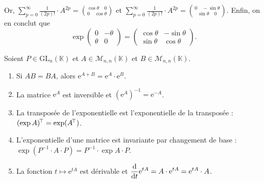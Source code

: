 \begin{exm}
\begin{enumerate}
			\null\hfill\null
			 \null\hfill\null

			Or, $\sum_{p=0}^{\infty} \frac{1}{(2p)!} \cdot A^{2p} = {\cos \theta\quad 0\choose 0 \quad \cos \theta}$\/ et $\sum_{p=0}^{\infty} \frac{1}{(2p)!} \cdot A^{2p} = {0 \quad -\sin \theta\choose \sin \theta \quad 0}$.
			Enfin, on en conclut que \[
				\exp \begin{pmatrix}
					0 & -\theta\\
					\theta & 0
				\end{pmatrix} = \begin{pmatrix}
					\cos \theta & -\sin \theta\\
					\sin \theta & \cos \theta
				\end{pmatrix}
			.\] 
	\end{enumerate}
\end{exm}

\begin{prop}
	Soient $P \in \mathrm{GL}_n(\mathds{K})$\/ et $A \in \mathcal{M}_{n,n}(\mathds{K})$ et $B \in \mathcal{M}_{n,n}(\mathds{K})$.
	\begin{enumerate}
		\item Si $AB = BA$, alors $\mathrm{e}^{A+B} = \mathrm{e}^{A} \cdot \mathrm{e}^{B}$.
		\item La matrice $\mathrm{e}^{A}$ est inversible et $(\mathrm{e}^{A})^{-1} = \mathrm{e}^{-A}$.
		\item La transposée de l'exponentielle est l'exponentielle de la transposée : $(\exp A)^{\!\!\,\top} = \exp(A^{\!\!\,\top})$.
		\item L'exponentielle d'une matrice est invariante par changement de base : $\exp(P^{-1} \cdot A \cdot P) = P^{-1} \cdot \exp A \cdot P$.
		\item La fonction $t \mapsto \mathrm{e}^{tA}$ est dérivable et $\displaystyle\frac{\mathrm{d}}{\mathrm{d}t} \mathrm{e}^{tA} = A\cdot \mathrm{e}^{tA} = \mathrm{e}^{tA}\cdot A$.
	\end{enumerate}
\end{prop}

